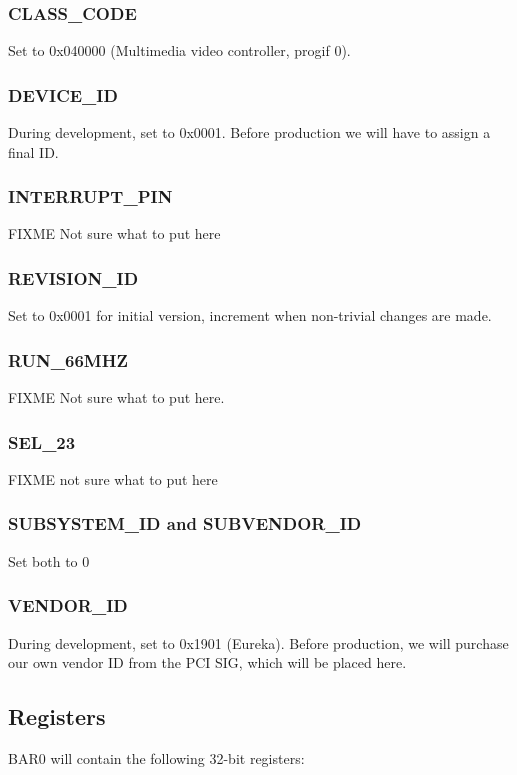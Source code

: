 \documentclass[12pt]{article}
\begin{document}
\subsubsection{CLASS\_CODE}
Set to 0x040000 (Multimedia video controller, progif 0).

\subsubsection{DEVICE\_ID}
During development, set to 0x0001. Before production we will have to assign a final ID.

\subsubsection{INTERRUPT\_PIN}
FIXME Not sure what to put here

\subsubsection{REVISION\_ID}
Set to 0x0001 for initial version, increment when non-trivial changes are made.

\subsubsection{RUN\_66MHZ}
FIXME Not sure what to put here.

\subsubsection{SEL\_23}
FIXME not sure what to put here

\subsubsection{SUBSYSTEM\_ID and SUBVENDOR\_ID}
Set both to 0

\subsubsection{VENDOR\_ID}
During development, set to 0x1901 (Eureka). Before production, we will purchase our own vendor ID from the PCI SIG, which will be placed here.

\subsection{Registers}

BAR0 will contain the following 32-bit registers:
\end{document}
